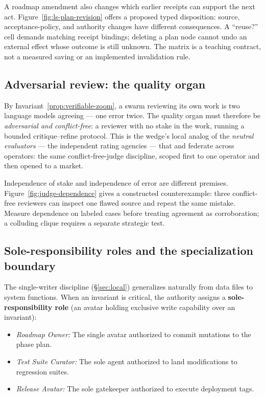 \documentclass[11pt,a4paper]{article}
\theoremstyle{definition}
\theoremstyle{plain}
\newcounter{protocol}[section]
\begin{document}
A roadmap amendment also changes which earlier receipts can support the next
act. Figure~\ref{fig:ls-plan-revision} offers a proposed typed disposition:
source, acceptance-policy, and authority changes have different consequences.
A ``reuse?'' cell demands matching receipt bindings; deleting a plan node cannot
undo an external effect whose outcome is still unknown. The matrix is a
teaching contract, not a measured saving or an implemented invalidation rule.


\subsection{Adversarial review: the quality organ}\label{sec:review}

By Invariant~\ref{prop:verifiable-zoom}, a swarm reviewing its own work is two language
models agreeing --- one error twice. The quality organ must therefore be
\emph{adversarial and conflict-free}: a reviewer with no stake in the work, running a
bounded critique--refine protocol. This is the wedge's local analog of the
\emph{neutral evaluators} --- the independent rating agencies --- that  and 
federate across operators: the same conflict-free-judge discipline, scoped
first to one operator and then opened to a market.

Independence of stake and independence of error are different premises.
Figure~\ref{fig:judge-dependence} gives a constructed counterexample: three
conflict-free reviewers can inspect one flawed source and repeat the same
mistake. Measure dependence on labeled cases before treating agreement as
corroboration; a colluding clique requires a separate strategic test.


\subsection{Sole-responsibility roles and the specialization boundary}\label{sec:sole-roles}

The single-writer discipline (\S\ref{sec:local}) generalizes naturally from data files to system functions. When an invariant is critical, the authority assigns a \textbf{sole-responsibility role} (an avatar holding exclusive write capability over an invariant):
\begin{itemize}[leftmargin=1.4em,itemsep=1pt]
\item \emph{Roadmap Owner:} The single avatar authorized to commit mutations to the phase plan.
\item \emph{Test Suite Curator:} The sole agent authorized to land modifications to regression suites.
\item \emph{Release Avatar:} The sole gatekeeper authorized to execute deployment tags.
\end{itemize}
\end{document}
